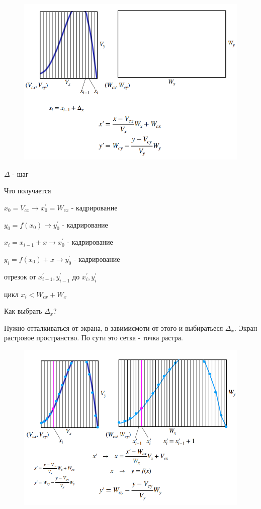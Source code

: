 \documentclass{article}
\begin{document}
\begin{figure} [H]
    \includegraphics[width=0.70\linewidth]{Снимок экрана 2025-03-17 123224.png}
\end{figure}

$\Delta$ - шаг 

Что получается

$x_0 = V_{cx}\longrightarrow x_{0}^{'} = W_{cx}$ - кадрирование

$y_0 = f(x_0)\longrightarrow y_{0}^{'}$ - кадрирование

$x_i = x_{i-1} + x \longrightarrow x_{0}^{'}$ - кадрирование


$y_i = f(x_0) + x \longrightarrow y_{0}^{'}$ - кадрирование

отрезок от $x_{i-1}^{'}, y_{i-1}^{'}$ до $x_{i}^{'}, y_{i}^{'}$

цикл $x_i < W_{cx}+W_x$

\vspace{3mm}

Как выбрать $\Delta_x$?

Нужно отталкиваться от экрана, в завимисмоти от этого и выбиратьеся $\Delta_x$.
Экран растровое пространство. По сути это сетка - точка растра.

\begin{figure} [H]
    \includegraphics[width=0.70\linewidth]{Снимок экрана 2025-03-17 125154.png}
\end{figure}
\end{document}
